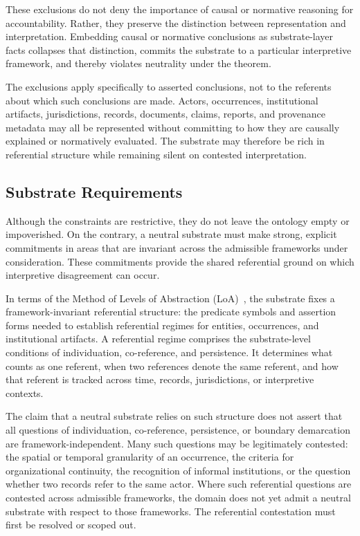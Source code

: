 These exclusions do not deny the importance of causal or normative reasoning for accountability.
Rather, they preserve the distinction between representation
and interpretation.
Embedding causal or normative conclusions as substrate-layer facts
collapses that distinction,
commits the substrate to a particular interpretive framework,
and thereby violates neutrality under the theorem.

The exclusions apply specifically to asserted conclusions,
not to the referents about which such conclusions are made.
Actors, occurrences, institutional artifacts, jurisdictions,
records, documents, claims, reports, and provenance metadata
may all be represented without committing to how they are
causally explained or normatively evaluated.
The substrate may therefore be rich in referential structure
while remaining silent on contested interpretation.

\subsection{Substrate Requirements}
\label{sec:substrate-requirements}

Although the constraints are restrictive,
they do not leave the ontology empty or impoverished.
On the contrary, a neutral substrate must make strong,
explicit commitments in areas that
are invariant
across the admissible frameworks under consideration.
These commitments provide the shared referential ground
on which interpretive disagreement can occur.

In terms of the Method of Levels of Abstraction
(LoA)~\citep{floridi2008levels,floridi2011philosophy},
the substrate fixes a framework-invariant referential structure:
the predicate symbols and assertion forms needed to establish
referential regimes for entities, occurrences,
and institutional artifacts.
A referential regime comprises the substrate-level conditions
of individuation, co-reference, and persistence.
It determines what counts as one referent,
when two references denote the same referent,
and how that referent is tracked across time,
records, jurisdictions, or interpretive contexts.

The claim that a neutral substrate relies on such structure
does not assert that all questions of
individuation, co-reference, persistence, or boundary demarcation
are framework-independent.
Many such questions may be legitimately contested:
the spatial or temporal granularity of an occurrence,
the criteria for organizational continuity,
the recognition of informal institutions,
or the question whether two records refer to the same actor.
Where such referential questions are contested across
admissible frameworks,
the domain does not yet admit a neutral substrate
with respect to those frameworks.
The referential contestation must first be resolved or scoped out.


